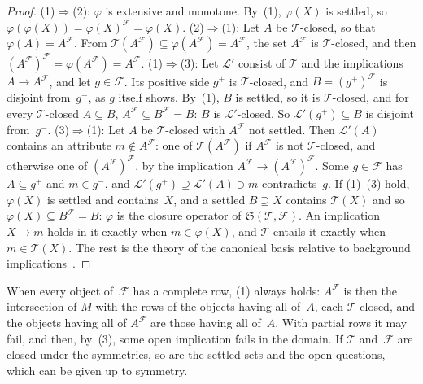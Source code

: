 \documentclass[11pt,a4paper]{article}
\theoremstyle{definition}
\theoremstyle{remark}
\newcommand{\cl}{\mathcal{L}}
\newcommand{\pos}{^{+}}
\newcommand{\nega}{^{-}}
\begin{document}
\begin{proof}
(1)$\Rightarrow$(2): $\varphi$ is extensive and monotone. By~(1), $\varphi(X)$ is settled, so $\varphi(\varphi(X)) = \varphi(X)^{\mathcal{F}} = \varphi(X)$.
(2)$\Rightarrow$(1): Let $A$ be $\mathcal{T}$-closed, so that $\varphi(A) = A^{\mathcal{F}}$. From $\mathcal{T}(A^{\mathcal{F}}) \subseteq \varphi(A^{\mathcal{F}}) = A^{\mathcal{F}}$, the set $A^{\mathcal{F}}$ is $\mathcal{T}$-closed, and then $(A^{\mathcal{F}})^{\mathcal{F}} = \varphi(A^{\mathcal{F}}) = A^{\mathcal{F}}$.
(1)$\Rightarrow$(3): Let $\cl'$ consist of $\mathcal{T}$ and the implications $A \to A^{\mathcal{F}}$, and let $g \in \mathcal{F}$. Its positive side $g\pos$ is $\mathcal{T}$-closed, and $B = (g\pos)^{\mathcal{F}}$ is disjoint from~$g\nega$, as $g$ itself shows. By~(1), $B$ is settled, so it is $\mathcal{T}$-closed, and for every $\mathcal{T}$-closed $A \subseteq B$, $A^{\mathcal{F}} \subseteq B^{\mathcal{F}} = B$: $B$ is $\cl'$-closed. So $\cl'(g\pos) \subseteq B$ is disjoint from~$g\nega$.
(3)$\Rightarrow$(1): Let $A$ be $\mathcal{T}$-closed with $A^{\mathcal{F}}$ not settled. Then $\cl'(A)$ contains an attribute $m \notin A^{\mathcal{F}}$: one of $\mathcal{T}(A^{\mathcal{F}})$ if $A^{\mathcal{F}}$ is not $\mathcal{T}$-closed, and otherwise one of $(A^{\mathcal{F}})^{\mathcal{F}}$, by the implication $A^{\mathcal{F}} \to (A^{\mathcal{F}})^{\mathcal{F}}$. Some $g \in \mathcal{F}$ has $A \subseteq g\pos$ and $m \in g\nega$, and $\cl'(g\pos) \supseteq \cl'(A) \ni m$ contradicts~$g$.
If (1)--(3) hold, $\varphi(X)$ is settled and contains~$X$, and a settled $B \supseteq X$ contains $\mathcal{T}(X)$ and so $\varphi(X) \subseteq B^{\mathcal{F}} = B$: $\varphi$ is the closure operator of $\mathfrak{S}(\mathcal{T}, \mathcal{F})$. An implication $X \to m$ holds in it exactly when $m \in \varphi(X)$, and $\mathcal{T}$ entails it exactly when $m \in \mathcal{T}(X)$. The rest is the theory of the canonical basis relative to background implications~\cite{GO16}.
\end{proof}

When every object of~$\mathcal{F}$ has a complete row, (1) always holds: $A^{\mathcal{F}}$ is then the intersection of $M$ with the rows of the objects having all of~$A$, each $\mathcal{T}$-closed, and the objects having all of $A^{\mathcal{F}}$ are those having all of~$A$. With partial rows it may fail, and then, by~(3), some open implication fails in the domain. If $\mathcal{T}$ and~$\mathcal{F}$ are closed under the symmetries, so are the settled sets and the open questions, which can be given up to symmetry.
\end{document}
